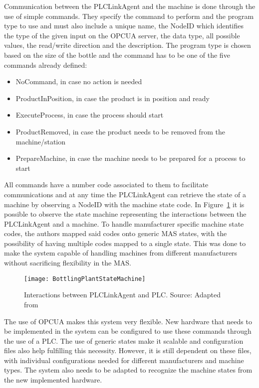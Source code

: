 Communication between the PLCLinkAgent and the machine is done through the use of simple commands. They specify the command to perform and the program type to use and must also include a unique name, the NodeID which identifies the type of the given input on the \acrshort{OPCUA} server, the data type, all possible values, the read/write direction and the description. The program type is chosen based on the size of the bottle and the command has to be one of the five commands already defined:

\begin{itemize}
	\item NoCommand, in case no action is needed
	\item ProductInPosition, in case the product is in position and ready
	\item ExecuteProcess, in case the process should start
	\item ProductRemoved, in case the product needs to be removed from the machine/station
	\item PrepareMachine, in case the machine needs to be prepared for a process to start
\end{itemize}

All commands have a number code associated to them to facilitate communications and at any time the PLCLinkAgent can retrieve the state of a machine by observing a NodeID with the machine state code. In Figure~\ref{fig:bottling_plant_state_achine} it is possible to observe the state machine representing the interactions between the PLCLinkAgent and a machine. To handle manufacturer specific machine state codes, the authors mapped said codes onto generic \acrshort{MAS} states, with the possibility of having multiple codes mapped to a single state. This was done to make the system capable of handling machines from different manufacturers without sacrificing flexibility in the \acrshort{MAS}.\\

\begin{figure}[H]
	\centering
	\texttt{[image: BottlingPlantStateMachine]}
	\caption{Interactions between PLCLinkAgent and \acrshort{PLC}. Source: Adapted from \cite{bottling_plant_part2}}
	\label{fig:bottling_plant_state_achine}
\end{figure}

The use of \acrshort{OPCUA} makes this system very flexible. New hardware that needs to be implemented in the system can be configured to use these commands through the use of a \acrshort{PLC}. The use of generic states make it scalable and configuration files also help fulfilling this necessity. However, it is still dependent on these files, with individual configurations needed for different manufacturers and machine types. The system also needs to be adapted to recognize the machine states from the new implemented hardware.\\

